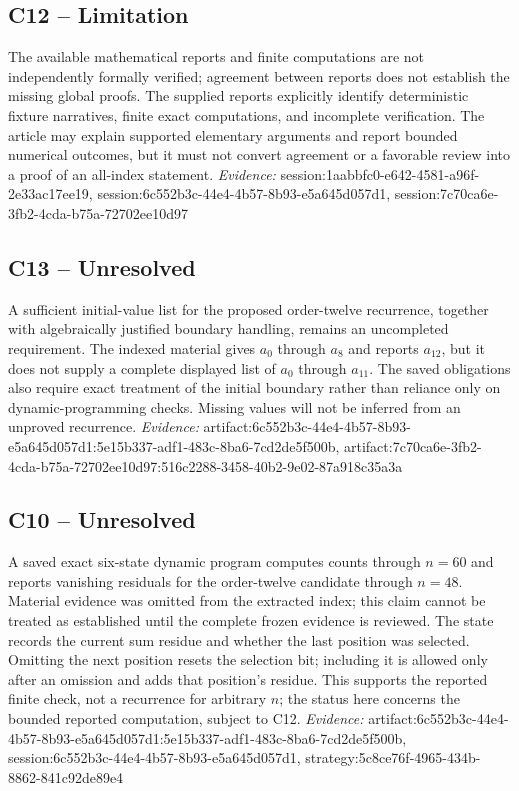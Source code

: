 \documentclass[11pt]{article}
\begin{document}
\subsection{C12 -- Limitation}
The available mathematical reports and finite computations are not independently formally verified; agreement between reports does not establish the missing global proofs.
The supplied reports explicitly identify deterministic fixture narratives, finite exact computations, and incomplete verification. The article may explain supported elementary arguments and report bounded numerical outcomes, but it must not convert agreement or a favorable review into a proof of an all-index statement.
\textit{Evidence: }session:1aabbfc0-e642-4581-a96f-2e33ac17ee19, session:6c552b3c-44e4-4b57-8b93-e5a645d057d1, session:7c70ca6e-3fb2-4cda-b75a-72702ee10d97
\subsection{C13 -- Unresolved}
A sufficient initial-value list for the proposed order-twelve recurrence, together with algebraically justified boundary handling, remains an uncompleted requirement.
The indexed material gives $a_0$ through $a_8$ and reports $a_{12}$, but it does not supply a complete displayed list of $a_0$ through $a_{11}$. The saved obligations also require exact treatment of the initial boundary rather than reliance only on dynamic-programming checks. Missing values will not be inferred from an unproved recurrence.
\textit{Evidence: }artifact:6c552b3c-44e4-4b57-8b93-e5a645d057d1:5e15b337-adf1-483c-8ba6-7cd2de5f500b, artifact:7c70ca6e-3fb2-4cda-b75a-72702ee10d97:516c2288-3458-40b2-9e02-87a918c35a3a
\subsection{C10 -- Unresolved}
A saved exact six-state dynamic program computes counts through $n=60$ and reports vanishing residuals for the order-twelve candidate through $n=48$.
Material evidence was omitted from the extracted index; this claim cannot be treated as established until the complete frozen evidence is reviewed. The state records the current sum residue and whether the last position was selected. Omitting the next position resets the selection bit; including it is allowed only after an omission and adds that position's residue. This supports the reported finite check, not a recurrence for arbitrary $n$; the status here concerns the bounded reported computation, subject to C12.
\textit{Evidence: }artifact:6c552b3c-44e4-4b57-8b93-e5a645d057d1:5e15b337-adf1-483c-8ba6-7cd2de5f500b, session:6c552b3c-44e4-4b57-8b93-e5a645d057d1, strategy:5c8ce76f-4965-434b-8862-841c92de89e4
\end{document}
